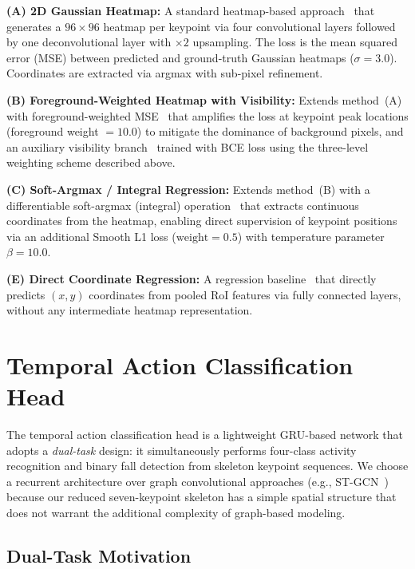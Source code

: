 \textbf{(A) 2D Gaussian Heatmap:} A standard heatmap-based approach~\cite{newell2016stacked, xiao2018simple} that generates a $96 \times 96$ heatmap per keypoint via four convolutional layers followed by one deconvolutional layer with $\times 2$ upsampling. The loss is the mean squared error (MSE) between predicted and ground-truth Gaussian heatmaps ($\sigma = 3.0$). Coordinates are extracted via argmax with sub-pixel refinement.

\textbf{(B) Foreground-Weighted Heatmap with Visibility:} Extends method~(A) with foreground-weighted MSE~\cite{zhang2020distribution} that amplifies the loss at keypoint peak locations (foreground weight $= 10.0$) to mitigate the dominance of background pixels, and an auxiliary visibility branch~\cite{li2019crowdpose} trained with BCE loss using the three-level weighting scheme described above.

\textbf{(C) Soft-Argmax / Integral Regression:} Extends method~(B) with a differentiable soft-argmax (integral) operation~\cite{nibali2018numerical, sun2018integral} that extracts continuous coordinates from the heatmap, enabling direct supervision of keypoint positions via an additional Smooth L1 loss ($\text{weight} = 0.5$) with temperature parameter $\beta = 10.0$.

\textbf{(E) Direct Coordinate Regression:} A regression baseline~\cite{toshev2014deeppose} that directly predicts $(x, y)$ coordinates from pooled RoI features via fully connected layers, without any intermediate heatmap representation.

\section{Temporal Action Classification Head}
\label{sec:action_head}

The temporal action classification head is a lightweight GRU-based network that adopts a \emph{dual-task} design: it simultaneously performs four-class activity recognition and binary fall detection from skeleton keypoint sequences. We choose a recurrent architecture over graph convolutional approaches (e.g., ST-GCN~\cite{yan2018spatial}) because our reduced seven-keypoint skeleton has a simple spatial structure that does not warrant the additional complexity of graph-based modeling.

\subsection{Dual-Task Motivation}
\label{subsec:dual_task_motivation}

